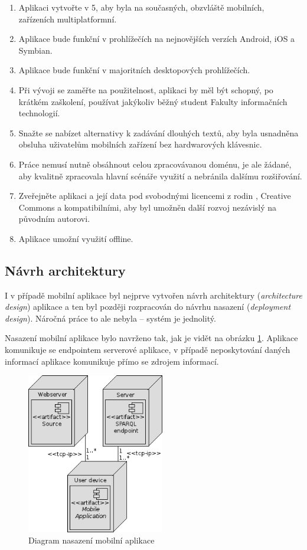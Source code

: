 \begin{enumerate}
 \item Aplikaci vytvořte v 5, aby byla na současných, obzvláště mobilních, zařízeních multiplatformní.
 \item Aplikace bude funkční v prohlížečích na nejnovějších verzích  Android, iOS a Symbian.
 \item Aplikace bude funkční v majoritních desktopových prohlížečích.
 \item Při vývoji se zaměřte na použitelnost, aplikaci by měl být schopný, po krátkém zaškolení, používat jakýkoliv běžný student Fakulty informačních technologií.
 \item Snažte se nabízet alternativy k zadávání dlouhých textů, aby byla usnadněna obsluha uživatelům mobilních zařízení bez hardwarových klávesnic.
 \item Práce nemusí nutně obsáhnout celou zpracovávanou doménu, je ale žádané, aby kvalitně zpracovala hlavní scénáře využití a nebránila dalšímu rozšiřování.
 \item Zveřejněte aplikaci a její data pod svobodnými licencemi z rodin , Creative Commons a kompatibilními, aby byl umožněn další rozvoj nezávislý na původním autorovi.
 \item Aplikace umožní využití offline.
\end{enumerate}


\subsection{Návrh architektury}
I v případě mobilní aplikace byl nejprve vytvořen návrh architektury (\textit{architecture design}) aplikace a ten byl později rozpracován do návrhu nasazení (\textit{deployment design}). Náročná práce to ale nebyla -- systém je jednolitý.

Nasazení mobilní aplikace bylo navrženo tak, jak je vidět na obrázku \ref{fig:mobile:deployment}. Aplikace komunikuje se  endpointem serverové aplikace, v případě neposkytování daných informací aplikace komunikuje přímo se zdrojem informací.
\begin{figure}[h]
 \centering
 \includegraphics[width=6cm]{./figures/deployment-m.png}
 \caption{Diagram nasazení mobilní aplikace}
 \label{fig:mobile:deployment}
\end{figure}


